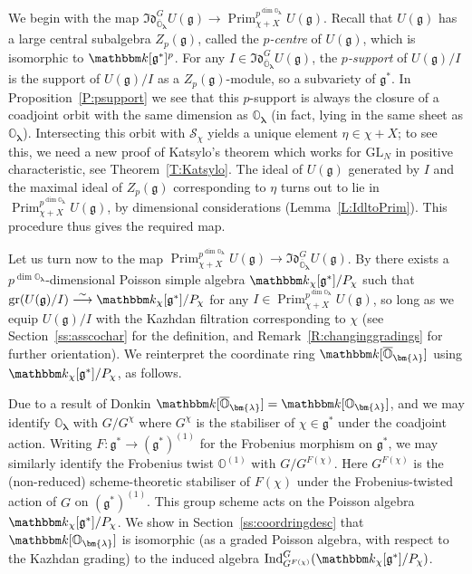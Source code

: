 \documentclass[twoside,12pt,reqno]{amsart}
\theoremstyle{remark}
\numberwithin{equation}{section}
\def\isoto{\overset{\sim}{\longrightarrow}}
\def\k{{\mathbbm k}}
\def\gr{\operatorname{gr}}
\def\Ind{\operatorname{Ind}}
\def\Prim{\operatorname{Prim}}
\def\blambda{{\bm{\lambda}}}
\def\o{\overline}
\def\O{{\mathbb O}}
\def\cO{{\overline{\mathbb O}}}
\def\GL{\mathrm{GL}}
\def\g{{\mathfrak g}}
\def\Idl{\mathfrak{Id}}
\renewcommand{\S}{\mathcal{S}}
\begin{document}
We begin with the map $\Idl_{\o\O_\blambda}^G U(\g)\to \Prim_{\chi+X}^{p^{\dim \O_\blambda}}U(\g)$. Recall that $U(\g)$ has a large central subalgebra $Z_p(\g)$, called the {\em $p$-centre} of $U(\g)$, which is isomorphic to $\k[\g^*]^p$. For any $I\in\Idl_{\o\O_\blambda}^G U(\g)$, the {\em $p$-support} of $U(\g)/I$ is the support of $U(\g)/I$ as a $Z_p(\g)$-module, so a subvariety of $\g^*$. In Proposition~\ref{P:psupport} we see that this $p$-support is always the closure of a coadjoint orbit with the same dimension as $\O_\blambda$ (in fact, lying in the same sheet as $\O_\blambda$). Intersecting this orbit with $\S_\chi$ yields a unique element $\eta\in\chi+X$; to see this, we need a new proof of Katsylo's theorem \cite{Kat} which works for $\GL_N$ in positive characteristic, see Theorem~\ref{T:Katsylo}. The ideal of $U(\g)$ generated by $I$ and the maximal ideal of $Z_p(\g)$ corresponding to $\eta$ turns out to lie in $\Prim_{\chi+X}^{p^{\dim \O_\blambda}}U(\g)$, by dimensional considerations (Lemma~\ref{L:IdltoPrim}). This procedure thus gives the required map. 

Let us turn now to the map $\Prim_{\chi+X}^{p^{\dim \O_\blambda}}U(\g)\to \Idl_{\o\O_\blambda}^G U(\g)$. By \cite[Proposition 3.4(1)]{PSk} there exists a $p^{\dim\O_\blambda}$-dimensional Poisson simple algebra $\k_\chi[\g^*]/P_\chi$ such that $\gr(U(\g)/I)\isoto\k_\chi[\g^*]/P_\chi$ for any $I\in \Prim_{\chi+X}^{p^{\dim \O_\blambda}}U(\g)$, so long as we equip $U(\g)/I$ with the Kazhdan filtration corresponding to $\chi$ (see Section~\ref{ss:asscochar} for the definition, and Remark~\ref{R:changinggradings} for further orientation). We reinterpret the coordinate ring $\k[\cO_\blambda]$ using $\k_\chi[\g^*]/P_\chi$, as follows. 

Due to a result of Donkin \cite{Do} $\k[\cO_\blambda]=\k[\O_\blambda]$, and we may identify $\O_\blambda$ with $G/G^\chi$ where $G^\chi$ is the stabiliser of $\chi\in\g^*$ under the coadjoint action. Writing $F:\g^*\to (\g^*)^{(1)}$ for the Frobenius morphism on $\g^*$, we may similarly identify the Frobenius twist $\O^{(1)}$ with $G/G^{F(\chi)}$. Here $G^{F(\chi)}$ is the (non-reduced) scheme-theoretic stabiliser of $F(\chi)$ under the Frobenius-twisted action of $G$ on $(\g^*)^{(1)}$. This group scheme acts on the Poisson algebra $\k_\chi[\g^*]/P_\chi$. We show in Section~\ref{ss:coordringdesc} that $\k[\O_\blambda]$ is isomorphic (as a graded Poisson algebra, with respect to the Kazhdan grading) to the induced algebra $\Ind_{G^{F(\chi)}}^G (\k_\chi[\g^*]/P_\chi)$.
\end{document}
